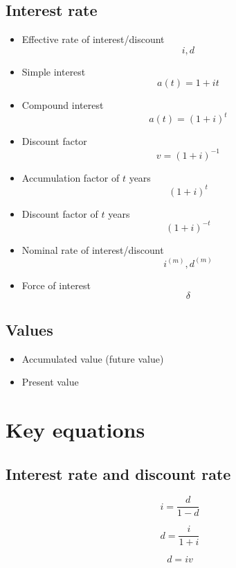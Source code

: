 \documentclass[
]{book}
\begin{document}
\hypertarget{interest-rate-1}{%
\subsection*{Interest rate}\label{interest-rate-1}}

\begin{itemize}
\item
  Effective rate of interest/discount \[i,d\]
\item
  Simple interest \[a(t)=1+it\]
\item
  Compound interest \[a(t)=(1+i)^t\]
\item
  Discount factor \[v=(1+i)^{-1}\]
\item
  Accumulation factor of \(t\) years \[(1+i)^t\]
\item
  Discount factor of \(t\) years \[(1+i)^{-t}\]
\item
  Nominal rate of interest/discount \[i^{(m)},d^{(m)}\]
\item
  Force of interest \[\delta\]
\end{itemize}

\hypertarget{values}{%
\subsection*{Values}\label{values}}

\begin{itemize}
\item
  Accumulated value (future value)
\item
  Present value
\end{itemize}

\hypertarget{key-equations}{%
\section{Key equations}\label{key-equations}}

\hypertarget{interest-rate-and-discount-rate}{%
\subsection*{Interest rate and discount rate}\label{interest-rate-and-discount-rate}}

\[i=\frac{d}{1-d}\]

\[d=\frac{i}{1+i}\]

\[d=iv\]
\end{document}
